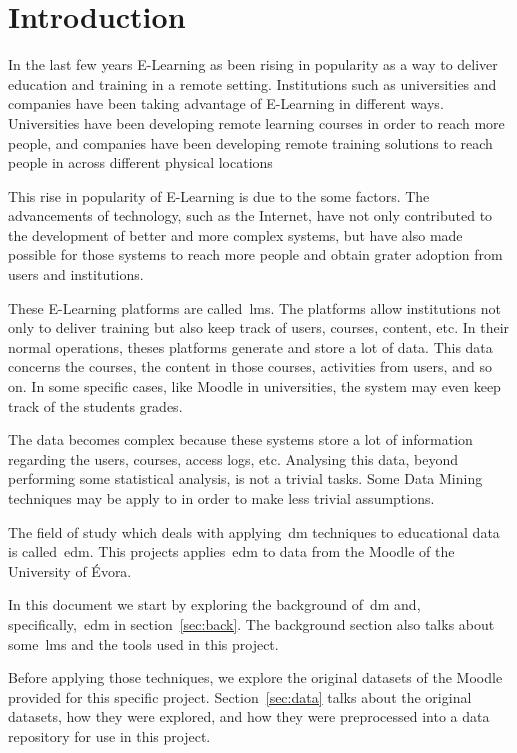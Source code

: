 \chapter{Introduction}

In the last few years E-Learning as been rising in popularity as a way to
deliver education and training in a remote setting. Institutions such as
universities and companies have been taking advantage of E-Learning in
different ways. Universities have been developing remote learning courses in
order to reach more people, and companies have been developing remote training
solutions to reach people in across different physical locations

This rise in popularity of E-Learning is due to the some factors. The
advancements of technology, such as the Internet, have not only contributed to
the development of better and more complex systems, but have also made possible
for those systems to reach more people and obtain grater adoption from users
and institutions.

These E-Learning platforms are called~\gls{lms}. The platforms
allow institutions not only to deliver training but also keep track of users,
courses, content, etc. In their normal operations, theses platforms generate
and store a lot of data. This data concerns the courses, the content in those
courses, activities from users, and so on. In some specific cases, like Moodle
in universities, the system may even keep track of the students grades.

The data becomes complex because these systems store a lot of information
regarding the users, courses, access logs, etc. Analysing this data, beyond
performing some statistical analysis, is not a trivial tasks. Some Data Mining
techniques may be apply to in order to make less trivial assumptions.

The field of study which deals with applying~\gls{dm} techniques to educational
data is called~\gls{edm}. This projects applies~\gls{edm} to data from the
Moodle of the University of Évora.~\cite{ind_010, ind_011, ind_013, ind_014,
ind_015}

In this document we start by exploring the background of~\gls{dm} and,
specifically,~\gls{edm} in section~\ref{sec:back}. The background section also
talks about some~\gls{lms} and the tools used in this project.

Before applying those techniques, we explore the original datasets of the
Moodle provided for this specific project. Section~\ref{sec:data} talks about
the original datasets, how they were explored, and how they were preprocessed
into a data repository for use in this project.

